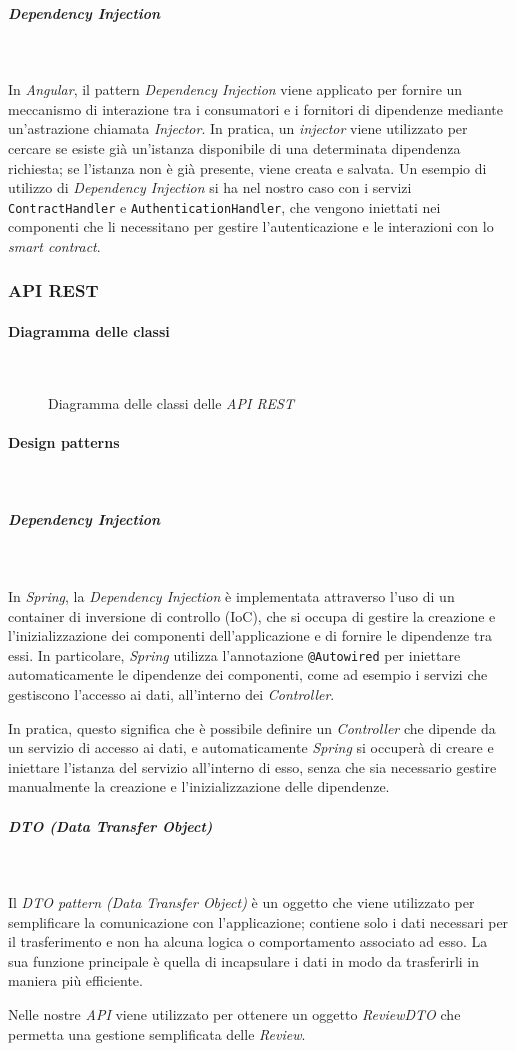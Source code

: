 \subparagraph*{Dependency Injection}~

\noindent In \textit{Angular}, il pattern \textit{Dependency Injection} viene applicato per fornire un meccanismo di interazione tra i consumatori e i fornitori di dipendenze mediante un'astrazione chiamata \textit{Injector}. In pratica, un \textit{injector} viene utilizzato per cercare se esiste già un'istanza disponibile di una determinata dipendenza richiesta; se l'istanza non è già presente, viene creata e salvata. Un esempio di utilizzo di \textit{Dependency Injection} si ha nel nostro caso con i servizi \texttt{ContractHandler} e \texttt{AuthenticationHandler}, che vengono iniettati nei componenti che li necessitano per gestire l'autenticazione e le interazioni con lo \textit{smart contract}.

\subsubsection{API REST}
\paragraph{Diagramma delle classi}~
\begin{figure}[H]
    
    \caption{Diagramma delle classi delle \textit{API REST}}\label{fig:apirest}
\end{figure}

\paragraph{Design patterns}~

\subparagraph*{Dependency Injection}~

\noindent In \textit{Spring}, la \textit{Dependency Injection} è implementata attraverso l'uso di un container di inversione di controllo (IoC), che si occupa di gestire la creazione e l'inizializzazione dei componenti dell'applicazione e di fornire le dipendenze tra essi. In particolare, \textit{Spring} utilizza l'annotazione \texttt{@Autowired} per iniettare automaticamente le dipendenze dei componenti, come ad esempio i servizi che gestiscono l'accesso ai dati, all'interno dei \textit{Controller}.

In pratica, questo significa che è possibile definire un \textit{Controller} che dipende da un servizio di accesso ai dati, e automaticamente \textit{Spring} si occuperà di creare e iniettare l'istanza del servizio all'interno di esso, senza che sia necessario gestire manualmente la creazione e l'inizializzazione delle dipendenze.

\subparagraph*{DTO (Data Transfer Object)}~

\noindent Il \textit{DTO pattern (Data Transfer Object)} è un oggetto che viene utilizzato per semplificare la comunicazione con l'applicazione; contiene solo i dati necessari per il trasferimento e non ha alcuna logica o comportamento associato ad esso. La sua funzione principale è quella di incapsulare i dati in modo da trasferirli in maniera più efficiente. 

Nelle nostre \textit{API} viene utilizzato per ottenere un oggetto \textit{ReviewDTO} che permetta una gestione semplificata delle \textit{Review}.
\pagebreak